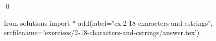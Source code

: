 
\begin{ex}
  \label{ex:2-18-characters-and-cstrings}
  
  \qed
\end{ex}
\begin{python0}
from solutions import *
add(label="ex:2-18-characters-and-cstrings",
    srcfilename='exercises/2-18-characters-and-cstrings/answer.tex')
\end{python0}
